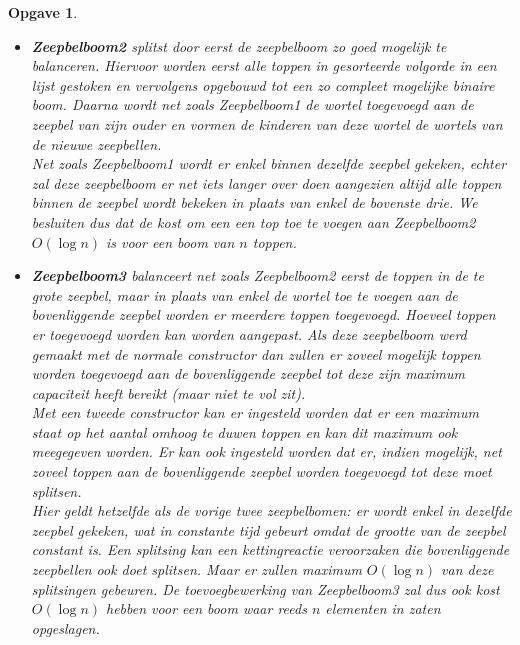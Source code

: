 \documentclass[12pt,hidelinks]{article}
\newtheorem{opgave}{Opgave}
\newcommand{\newln}{~\\\vspace{0.5em}}
\begin{document}
\begin{opgave}
\begin{enumerate}[a.]
\begin{itemize}
                    \item \textbf{Zeepbelboom2} splitst door eerst de zeepbelboom zo goed mogelijk te balanceren. 
                        Hiervoor worden eerst alle toppen in gesorteerde volgorde in een lijst gestoken en vervolgens opgebouwd tot een zo compleet mogelijke binaire boom. 
                        Daarna wordt net zoals Zeepbelboom1 de wortel toegevoegd aan de zeepbel van zijn ouder en vormen de kinderen van deze wortel de wortels van de nieuwe zeepbellen.
                        \newln
                        Net zoals Zeepbelboom1 wordt er enkel binnen dezelfde zeepbel gekeken, echter zal deze zeepbelboom er net iets langer over doen aangezien altijd alle toppen binnen de zeepbel wordt bekeken in plaats van enkel de bovenste drie. 
                        We besluiten dus dat de kost om een een top toe te voegen aan Zeepbelboom2 $O(\log n)$ is voor een boom van $n$ toppen.
                    \item \textbf{Zeepbelboom3} balanceert net zoals Zeepbelboom2 eerst de toppen in de te grote zeepbel, maar in plaats van enkel de wortel toe te voegen aan de bovenliggende zeepbel worden er meerdere toppen toegevoegd.
                        Hoeveel toppen er toegevoegd worden kan worden aangepast. 
                        Als deze zeepbelboom werd gemaakt met de normale constructor dan zullen er zoveel mogelijk toppen worden toegevoegd aan de bovenliggende zeepbel tot deze zijn maximum capaciteit heeft bereikt (maar niet te vol zit).
                        \newln
                        Met een tweede constructor kan er ingesteld worden dat er een maximum staat op het aantal omhoog te duwen toppen en kan dit maximum ook meegegeven worden.
                        Er kan ook ingesteld worden dat er, indien mogelijk, net zoveel toppen aan de bovenliggende zeepbel worden toegevoegd tot deze moet splitsen.
                        \newln
                        Hier geldt hetzelfde als de vorige twee zeepbelbomen: er wordt enkel in dezelfde zeepbel gekeken, wat in constante tijd gebeurt omdat de grootte van de zeepbel constant is.
                        Een splitsing kan een kettingreactie veroorzaken die bovenliggende zeepbellen ook doet splitsen. Maar er zullen maximum $O(\log n)$ van deze splitsingen gebeuren.
                        De toevoegbewerking van Zeepbelboom3 zal dus ook kost $O(\log n)$ hebben voor een boom waar reeds $n$ elementen in zaten
                        opgeslagen.
                \end{itemize}



\end{enumerate}
\end{opgave}
\end{document}
